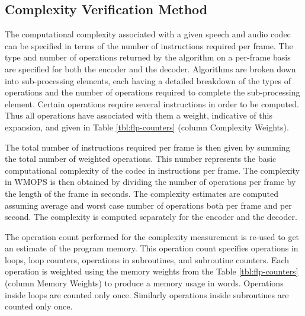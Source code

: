\subsection{Complexity Verification Method}
The computational complexity associated with a given speech and audio 
codec can be specified in terms of the number of instructions required 
per frame. The type and number of operations returned by the algorithm 
on a per-frame basis are specified for both the encoder and the 
decoder. Algorithms are broken down into sub-processing elements, each 
having a detailed breakdown of the types of operations and the number 
of operations required to complete the sub-processing element. Certain 
operations require several instructions in order to be computed. Thus 
all operations have associated with them a weight, indicative of this 
expansion, and given in Table \ref{tbl:flp-counters} (column 
Complexity Weights).

The total number of instructions required per frame is then given by 
summing the total number of weighted operations. This number represents 
the basic computational complexity of the codec in instructions per 
frame. The complexity in WMOPS is then obtained by dividing the number 
of operations per frame by the length of the frame in seconds. The 
complexity estimates are computed assuming average and worst case 
number of operations both per frame and per second. The complexity 
is computed separately for the encoder and the decoder.

The operation count performed for the complexity measurement is re-used 
to get an estimate of the program memory. This operation count specifies 
operations in loops, loop counters, operations in subroutines, and 
subroutine counters. Each operation is weighted using the memory weights 
from the Table \ref{tbl:flp-counters} (column Memory Weights) to produce 
a memory usage in words. Operations inside loops are counted only once. 
Similarly operations inside subroutines are counted only once.


